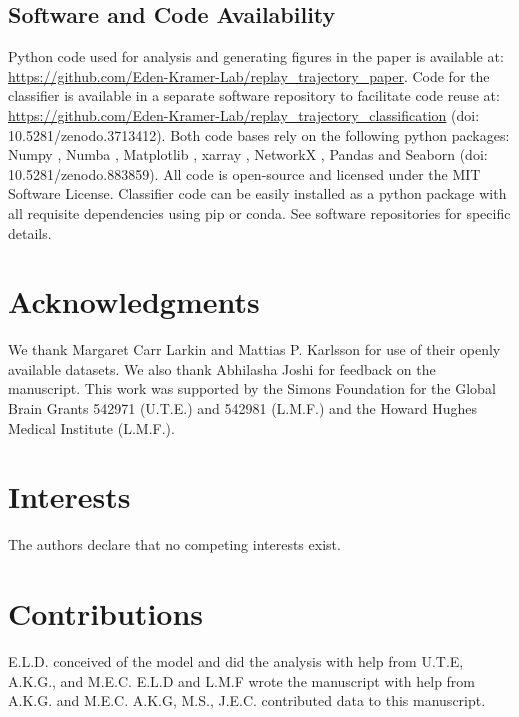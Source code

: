 \documentclass[9pt,lineno]{elife}
\begin{document}
\subsection*{Software and Code Availability}
Python code used for analysis and generating figures in the paper is available at: \url{https://github.com/Eden-Kramer-Lab/replay_trajectory_paper}. Code for the classifier is available in a separate software repository to facilitate code reuse at: \url{https://github.com/Eden-Kramer-Lab/replay_trajectory_classification} (doi: 10.5281/zenodo.3713412).
Both code bases rely on the following python packages: Numpy \citep{vanderWaltNumPyArrayStructure2011}, Numba \citep{LamNumbaLLVMbasedPython2015}, Matplotlib \citep{HunterMatplotlib2DGraphics2007}, xarray \citep{HoyerxarrayNDlabeled2017}, NetworkX \citep{HagbergExploringNetworkStructure2008}, Pandas \citep{McKinneyDataStructuresStatistical2010} and Seaborn (doi: 10.5281/zenodo.883859). All code is open-source and licensed under the MIT Software License. Classifier code can be easily installed as a python package with all requisite dependencies using pip or conda. See software repositories for specific details.

\section{Acknowledgments}
We thank Margaret Carr Larkin and Mattias P. Karlsson for use of their openly available datasets. We also thank Abhilasha Joshi for feedback on the manuscript. This work was supported by the Simons Foundation for the Global Brain Grants 542971 (U.T.E.) and 542981 (L.M.F.) and the Howard Hughes Medical Institute (L.M.F.).

\section{Interests}
The authors declare that no competing interests exist.

\section{Contributions}
E.L.D. conceived of the model and did the analysis with help from U.T.E, A.K.G., and M.E.C. E.L.D and L.M.F wrote the manuscript with help from A.K.G. and M.E.C. A.K.G, M.S., J.E.C. contributed data to this manuscript.


\end{document}
